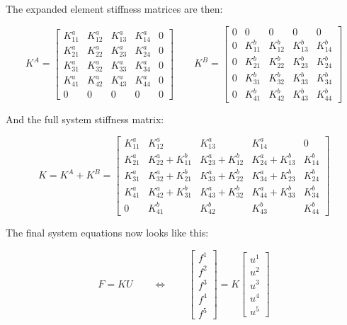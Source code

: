 The expanded element stiffness matrices are then:

\begin{equation}
K^A =
\begin{bmatrix}
K^a_{11} & K^a_{12} & K^a_{13} & K^a_{14} & 0\\
K^a_{21} & K^a_{22} & K^a_{23} & K^a_{24} & 0\\
K^a_{31} & K^a_{32} & K^a_{33} & K^a_{34} & 0\\
K^a_{41} & K^a_{42} & K^a_{43} & K^a_{44} & 0\\
0 & 0 & 0 & 0 & 0
\end{bmatrix}
\qquad
K^B =
\begin{bmatrix}
0 & 0 & 0 & 0 & 0 \\
0 & K^b_{11} & K^b_{12} & K^b_{13} & K^b_{14} \\
0 & K^b_{21} & K^b_{22} & K^b_{23} & K^b_{24} \\
0 & K^b_{31} & K^b_{32} & K^b_{33} & K^b_{34} \\
0 & K^b_{41} & K^b_{42} & K^b_{43} & K^b_{44}
\end{bmatrix}
\end{equation}

And the full system stiffness matrix:

\begin{equation}
\label{eq:system-stiffness-matrix}
K = K^A + K^B =
\begin{bmatrix}
K^a_{11} & K^a_{12} & K^a_{13} & K^a_{14} & 0\\

K^a_{21} & K^a_{22} + K^b_{11} & K^a_{23} + K^b_{12} & K^a_{24} +
K^b_{13} & K^b_{14}\\

K^a_{31} & K^a_{32} + K^b_{21} & K^a_{33} + K^b_{22} & K^a_{34} +
K^b_{23} & K^b_{24}\\

K^a_{41} & K^a_{42} + K^b_{31} & K^a_{43} + K^b_{32} & K^a_{44} +
K^b_{33} & K^b_{34}\\

0 & K^b_{41} & K^b_{42} & K^b_{43} & K^b_{44}
\end{bmatrix}
\end{equation}

The final system equations now looks like this:

\begin{equation}
F = K U
\qquad \Leftrightarrow \qquad
\begin{bmatrix}
f^1 \\
f^2 \\
f^3 \\
f^4 \\
f^5
\end{bmatrix}
= K
\begin{bmatrix}
u^1 \\
u^2 \\
u^3 \\
u^4 \\
u^5
\end{bmatrix}
\end{equation}

